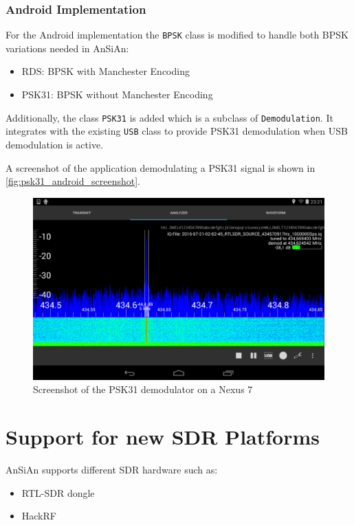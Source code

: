 \subsubsection{Android Implementation}

For the Android implementation the \texttt{BPSK} class is modified to handle both
\ac{BPSK} variations needed in \ac{AnSiAn}:
\begin{itemize}
	\item RDS: BPSK with Manchester Encoding
	\item PSK31: BPSK without Manchester Encoding
\end{itemize}

Additionally, the class \texttt{PSK31} is added which is a subclass of \texttt{Demodulation}.
It integrates with the existing \texttt{USB} class to provide PSK31 demodulation
when USB demodulation is active.

A screenshot of the application demodulating a \ac{PSK31} signal is shown in 
\autoref{fig:psk31_android_screenshot}.

\begin{figure}
	\centering
	\includegraphics[width=1\linewidth]{gfx/psk31/psk31_android_screenshot.png}
	\caption{Screenshot of the PSK31 demodulator on a Nexus 7}
	\label{fig:psk31_android_screenshot}
\end{figure}


\section{Support for new SDR Platforms}

\ac{AnSiAn} supports different \ac{SDR} hardware such as:
\begin{itemize}
	\item RTL-SDR dongle
	\item HackRF
\end{itemize}

